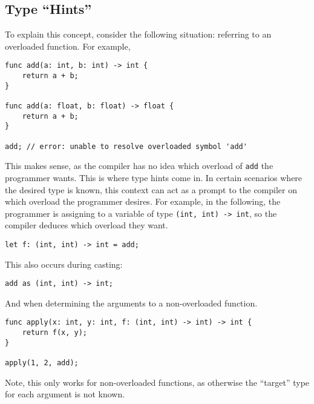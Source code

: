 \subsection{Type ``Hints''}\label{subsec:type-hints}

To explain this concept, consider the following situation: referring to an overloaded function.
For example,

\begin{lstlisting}[language=CustomLang]
func add(a: int, b: int) -> int {
    return a + b;
}

func add(a: float, b: float) -> float {
    return a + b;
}

add; // error: unable to resolve overloaded symbol 'add'
\end{lstlisting}

This makes sense, as the compiler has no idea which overload of \texttt{add} the programmer wants.
This is where type hints come in.
In certain scenarios where the desired type is known, this context can act as a prompt to the compiler on which overload the programmer desires.
For example, in the following, the programmer is assigning to a variable of type \texttt{(int, int) -> int}, so the compiler deduces which overload they want.

\begin{lstlisting}[language=CustomLang]
let f: (int, int) -> int = add;
\end{lstlisting}

This also occurs during casting:

\begin{lstlisting}[language=CustomLang]
add as (int, int) -> int;
\end{lstlisting}

And when determining the arguments to a non-overloaded function.

\begin{lstlisting}[language=CustomLang]
func apply(x: int, y: int, f: (int, int) -> int) -> int {
    return f(x, y);
}

apply(1, 2, add);
\end{lstlisting}

Note, this only works for non-overloaded functions, as otherwise the ``target'' type for each argument is not known.


